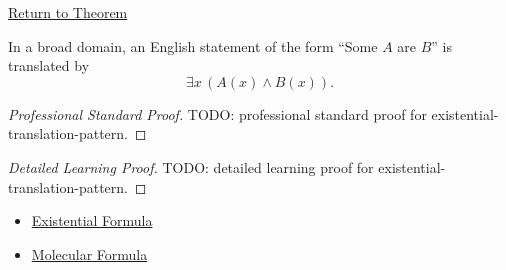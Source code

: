 \newpage
{}
\label{prf:existential-translation-pattern}

\begin{remark*}[Return]
\hyperref[prop:existential-translation-pattern]{Return to Theorem}
\end{remark*}

\begin{theorem*}
In a broad domain, an English statement of the form ``Some \(A\) are \(B\)''
is translated by
\[
\exists x\,(A(x)\land B(x)).
\]
\end{theorem*}

\begin{proof}[Professional Standard Proof]
\LRAProofBodyStart
TODO: professional standard proof for existential-translation-pattern.
\end{proof}

\begin{proof}[Detailed Learning Proof]
\LRAProofBodyStart
TODO: detailed learning proof for existential-translation-pattern.
\end{proof}

\begin{remark*}
\end{remark*}

\begin{dependencies}
\begin{itemize}
  \item \hyperref[def:existential-q]{Existential Formula}
  \item \hyperref[def:molecular]{Molecular Formula}
\end{itemize}
\end{dependencies}

\clearpage
